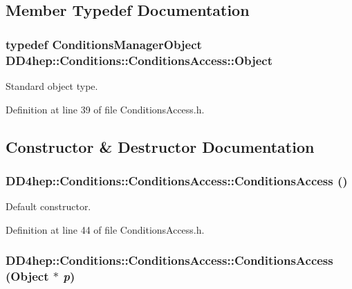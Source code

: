 \subsection{Member Typedef Documentation}
\hypertarget{class_d_d4hep_1_1_conditions_1_1_conditions_access_a5d82a416d51349abaf6075b2028faecc}{
\subsubsection[{Object}]{\setlength{\rightskip}{0pt plus 5cm}typedef {\bf ConditionsManagerObject} {\bf DD4hep::Conditions::ConditionsAccess::Object}}}
\label{class_d_d4hep_1_1_conditions_1_1_conditions_access_a5d82a416d51349abaf6075b2028faecc}


Standard object type. 

Definition at line 39 of file ConditionsAccess.h.

\subsection{Constructor \& Destructor Documentation}
\hypertarget{class_d_d4hep_1_1_conditions_1_1_conditions_access_a837aa2f7c771e192a535024a1fc2f10a}{
\subsubsection[{ConditionsAccess}]{\setlength{\rightskip}{0pt plus 5cm}DD4hep::Conditions::ConditionsAccess::ConditionsAccess ()}}
\label{class_d_d4hep_1_1_conditions_1_1_conditions_access_a837aa2f7c771e192a535024a1fc2f10a}


Default constructor. 

Definition at line 44 of file ConditionsAccess.h.\hypertarget{class_d_d4hep_1_1_conditions_1_1_conditions_access_a1f9e4b69121bbb7416bce5086bab7e9c}{
\subsubsection[{ConditionsAccess}]{\setlength{\rightskip}{0pt plus 5cm}DD4hep::Conditions::ConditionsAccess::ConditionsAccess ({\bf Object} $\ast$ {\em p})}}
\label{class_d_d4hep_1_1_conditions_1_1_conditions_access_a1f9e4b69121bbb7416bce5086bab7e9c}



